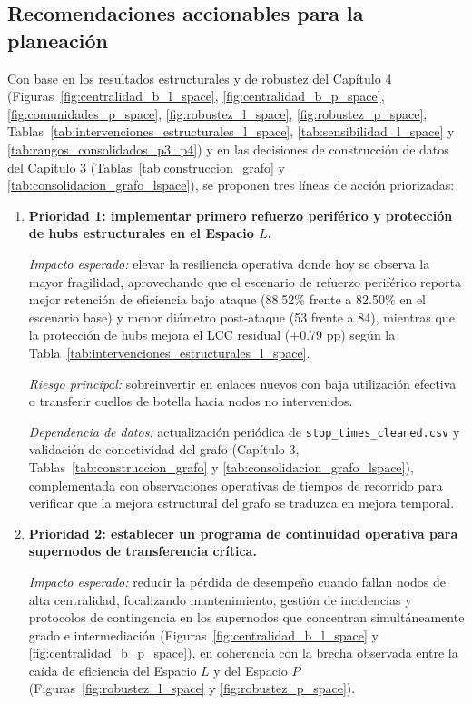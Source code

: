 \subsection{Recomendaciones accionables para la planeaci\'on}
Con base en los resultados estructurales y de robustez del Cap\'itulo 4 (Figuras~\ref{fig:centralidad_b_l_space}, \ref{fig:centralidad_b_p_space}, \ref{fig:comunidades_p_space}, \ref{fig:robustez_l_space}, \ref{fig:robustez_p_space}; Tablas~\ref{tab:intervenciones_estructurales_l_space}, \ref{tab:sensibilidad_l_space} y \ref{tab:rangos_consolidados_p3_p4}) y en las decisiones de construcci\'on de datos del Cap\'itulo 3 (Tablas~\ref{tab:construccion_grafo} y \ref{tab:consolidacion_grafo_lspace}), se proponen tres l\'ineas de acci\'on priorizadas:

\begin{enumerate}
    \item \textbf{Prioridad 1: implementar primero refuerzo perif\'erico y protecci\'on de hubs estructurales en el Espacio $L$.}

    \textit{Impacto esperado:} elevar la resiliencia operativa donde hoy se observa la mayor fragilidad, aprovechando que el escenario de refuerzo perif\'erico reporta mejor retenci\'on de eficiencia bajo ataque (88.52\% frente a 82.50\% en el escenario base) y menor di\'ametro post-ataque (53 frente a 84), mientras que la protecci\'on de hubs mejora el LCC residual (+0.79 pp) seg\'un la Tabla~\ref{tab:intervenciones_estructurales_l_space}.

    \textit{Riesgo principal:} sobreinvertir en enlaces nuevos con baja utilizaci\'on efectiva o transferir cuellos de botella hacia nodos no intervenidos.

    \textit{Dependencia de datos:} actualizaci\'on peri\'odica de \texttt{stop\_times\_cleaned.csv} y validaci\'on de conectividad del grafo (Cap\'itulo 3, Tablas~\ref{tab:construccion_grafo} y \ref{tab:consolidacion_grafo_lspace}), complementada con observaciones operativas de tiempos de recorrido para verificar que la mejora estructural del grafo se traduzca en mejora temporal.

    \item \textbf{Prioridad 2: establecer un programa de continuidad operativa para supernodos de transferencia cr\'itica.}

    \textit{Impacto esperado:} reducir la p\'erdida de desempe\~no cuando fallan nodos de alta centralidad, focalizando mantenimiento, gesti\'on de incidencias y protocolos de contingencia en los supernodos que concentran simult\'aneamente grado e intermediaci\'on (Figuras~\ref{fig:centralidad_b_l_space} y \ref{fig:centralidad_b_p_space}), en coherencia con la brecha observada entre la ca\'ida de eficiencia del Espacio $L$ y del Espacio $P$ (Figuras~\ref{fig:robustez_l_space} y \ref{fig:robustez_p_space}).


\end{enumerate}
